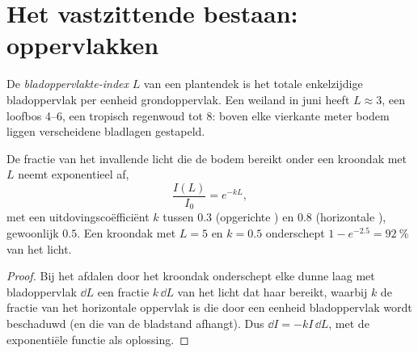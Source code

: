 \section{Het vastzittende bestaan: oppervlakken}

\begin{definition}\label{def:b1:flowering-plant-organization:lai}
De \emph{bladoppervlakte-index} $L$ van een
plantendek is het totale enkelzijdige bladoppervlak per eenheid grondoppervlak.
Een weiland in juni heeft $L \approx 3$, een loofbos \qtyrange{4}{6}{}, een
tropisch regenwoud tot \qty{8}{}: boven elke vierkante meter bodem liggen
verscheidene bladlagen gestapeld.
\end{definition}

\begin{proposition}\label{prop:b1:flowering-plant-organization:beer}
De fractie van het invallende licht die de bodem bereikt onder een kroondak met
 $L$ neemt exponentieel af,
\[
\frac{I(L)}{I_0} = e^{-kL},
\]
met een uitdovingscoëfficiënt $k$ tussen $0.3$ (opgerichte ) en
$0.8$ (horizontale ), gewoonlijk $0.5$. Een kroondak met $L = 5$ en
$k = 0.5$ onderschept $1 - e^{-2.5} = \qty{92}{\%}$ van het licht.
\end{proposition}
\begin{proof}
Bij het afdalen door het kroondak onderschept elke dunne laag met bladoppervlak
$\dd L$ een fractie $k\,\dd L$ van het licht dat haar bereikt, waarbij $k$ de
fractie van het horizontale oppervlak is die door een eenheid bladoppervlak
wordt beschaduwd (en die van de bladstand afhangt). Dus $\dd I = -kI\,\dd L$,
met de exponentiële functie als oplossing.
\end{proof}

